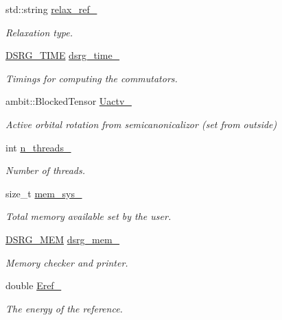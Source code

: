 \begin{DoxyCompactItemize}
std\+::string \mbox{\hyperlink{classforte_1_1_s_a_d_s_r_g_a1a4d557551c8301a07b438a48b51441d}{relax\+\_\+ref\+\_\+}}
\begin{DoxyCompactList}\small\item\em Relaxation type. \end{DoxyCompactList}\item 
\mbox{\hyperlink{classforte_1_1_d_s_r_g___t_i_m_e}{D\+S\+R\+G\+\_\+\+T\+I\+ME}} \mbox{\hyperlink{classforte_1_1_s_a_d_s_r_g_aaf6b70d03bcb03eab3c3be553d25fba1}{dsrg\+\_\+time\+\_\+}}
\begin{DoxyCompactList}\small\item\em Timings for computing the commutators. \end{DoxyCompactList}\item 
ambit\+::\+Blocked\+Tensor \mbox{\hyperlink{classforte_1_1_s_a_d_s_r_g_aedef111c78927c5638a7de753d335fcb}{Uactv\+\_\+}}
\begin{DoxyCompactList}\small\item\em Active orbital rotation from semicanonicalizor (set from outside) \end{DoxyCompactList}\item 
int \mbox{\hyperlink{classforte_1_1_s_a_d_s_r_g_ac967d862e1a4025de5bb43de96e8e4ec}{n\+\_\+threads\+\_\+}}
\begin{DoxyCompactList}\small\item\em Number of threads. \end{DoxyCompactList}\item 
size\+\_\+t \mbox{\hyperlink{classforte_1_1_s_a_d_s_r_g_ab4bdda21f00719c17a7f77f8488a1d93}{mem\+\_\+sys\+\_\+}}
\begin{DoxyCompactList}\small\item\em Total memory available set by the user. \end{DoxyCompactList}\item 
\mbox{\hyperlink{classforte_1_1_d_s_r_g___m_e_m}{D\+S\+R\+G\+\_\+\+M\+EM}} \mbox{\hyperlink{classforte_1_1_s_a_d_s_r_g_a02623e876f369017879511851016ae01}{dsrg\+\_\+mem\+\_\+}}
\begin{DoxyCompactList}\small\item\em Memory checker and printer. \end{DoxyCompactList}\item 
double \mbox{\hyperlink{classforte_1_1_s_a_d_s_r_g_a652b1cfc6ac0956beb3d6a2323135fdb}{Eref\+\_\+}}
\begin{DoxyCompactList}\small\item\em The energy of the reference. \end{DoxyCompactList}\item 

\end{DoxyCompactItemize}
